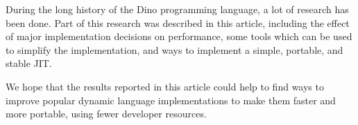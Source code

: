 \documentclass[preprint]{sigplanconf}
\begin{document}
  During the long history of the Dino programming language, a lot of research
has been done.  Part of this research was described in this article,
including the effect of major implementation decisions on performance,
some tools which can be used to simplify the implementation, and ways to
implement a simple, portable, and stable JIT.

  We hope that the results reported in this article could
help to find ways to improve popular dynamic language implementations
to make them faster and more portable, using fewer developer resources.





\end{document}
